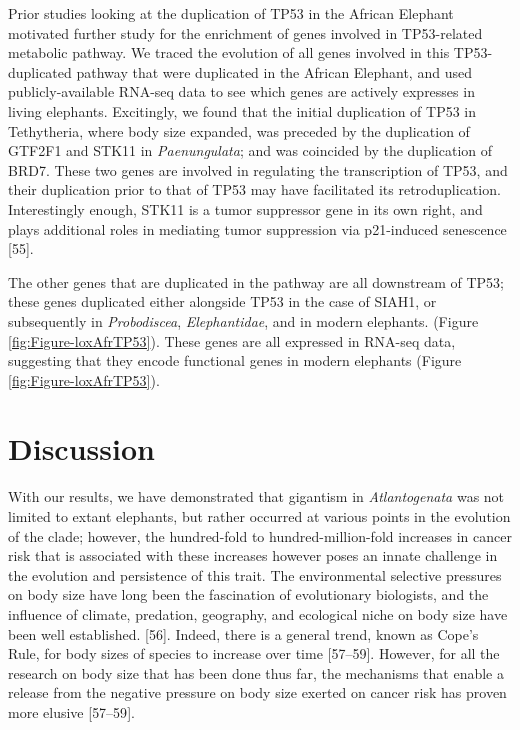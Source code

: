 \documentclass[]{elsarticle} %
\begin{document}
Prior studies looking at the duplication of TP53 in the African Elephant motivated further study for the enrichment of genes involved in TP53-related metabolic pathway. We traced the evolution of all genes involved in this TP53-duplicated pathway that were duplicated in the African Elephant, and used publicly-available RNA-seq data to see which genes are actively expresses in living elephants. Excitingly, we found that the initial duplication of TP53 in Tethytheria, where body size expanded, was preceded by the duplication of GTF2F1 and STK11 in \emph{Paenungulata}; and was coincided by the duplication of BRD7. These two genes are involved in regulating the transcription of TP53, and their duplication prior to that of TP53 may have facilitated its retroduplication. Interestingly enough, STK11 is a tumor suppressor gene in its own right, and plays additional roles in mediating tumor suppression via p21-induced senescence {[}55{]}.

The other genes that are duplicated in the pathway are all downstream of TP53; these genes duplicated either alongside TP53 in the case of SIAH1, or subsequently in \emph{Probodiscea}, \emph{Elephantidae}, and in modern elephants. (Figure \ref{fig:Figure-loxAfrTP53}). These genes are all expressed in RNA-seq data, suggesting that they encode functional genes in modern elephants (Figure \ref{fig:Figure-loxAfrTP53}).

\hypertarget{discussion}{%
\section{Discussion}\label{discussion}}

With our results, we have demonstrated that gigantism in \emph{Atlantogenata} was not limited to extant elephants, but rather occurred at various points in the evolution of the clade; however, the hundred-fold to hundred-million-fold increases in cancer risk that is associated with these increases however poses an innate challenge in the evolution and persistence of this trait.
The environmental selective pressures on body size have long been the fascination of evolutionary biologists, and the influence of climate, predation, geography, and ecological niche on body size have been well established. {[}56{]}. Indeed, there is a general trend, known as Cope's Rule, for body sizes of species to increase over time {[}57--59{]}. However, for all the research on body size that has been done thus far, the mechanisms that enable a release from the negative pressure on body size exerted on cancer risk has proven more elusive {[}57--59{]}.
\end{document}
